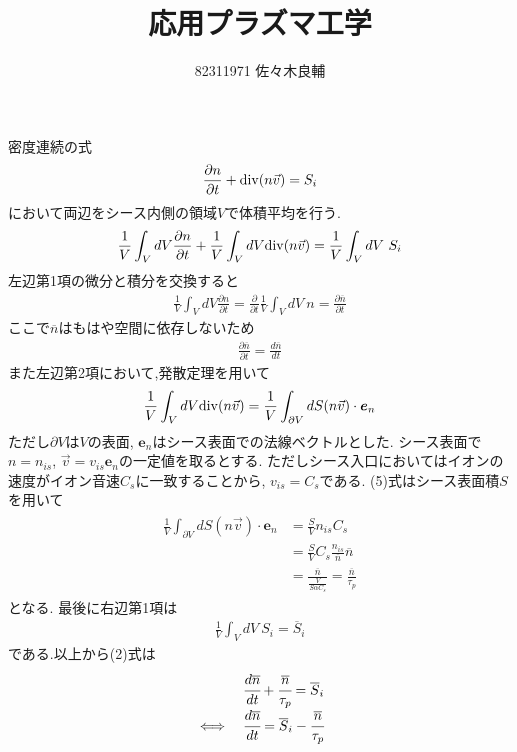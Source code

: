 \documentclass[uplatex,a4j,11pt,dvipdfmx]{jsarticle}
\begin{document}
\title{応用プラズマ工学}
\author{82311971 佐々木良輔}
\date{}
\maketitle
密度連続の式
\begin{align}
  \frac{\partial n}{\partial t}+{\rm div}(n\vec{v})=S_i
\end{align}
において両辺をシース内側の領域$V$で体積平均を行う.
\begin{align}
  \frac{1}{V}\int_VdV\frac{\partial n}{\partial t}+\frac{1}{V}\int_VdV{\rm div}(n\vec{v})=\frac{1}{V}\int_VdV\ S_i
\end{align}
左辺第1項の微分と積分を交換すると
\begin{align}
  \frac{1}{V}\int_VdV\frac{\partial n}{\partial t}=\frac{\partial}{\partial t}\frac{1}{V}\int_VdV\ n=\frac{\partial\overline{n}}{\partial t}
\end{align}
ここで$\overline{n}$はもはや空間に依存しないため
\begin{align}
  \frac{\partial\overline{n}}{\partial t}=\frac{d\overline{n}}{dt}
\end{align}
また左辺第2項において,発散定理を用いて
\begin{align}
  \frac{1}{V}\int_VdV{\rm div}(n\vec{v})=\frac{1}{V}\int_{\partial V}dS(n\vec{v})\cdot{\bm e}_n
\end{align}
ただし$\partial V$は$V$の表面, ${\bm e}_n$はシース表面での法線ベクトルとした.
シース表面で$n=n_{is}$, $\vec{v}=v_{is}{\bm e}_n$の一定値を取るとする.
ただしシース入口においてはイオンの速度がイオン音速$C_s$に一致することから, $v_{is}=C_s$である.
(5)式はシース表面積$S$を用いて
\begin{align}
  \begin{split}
    \frac{1}{V}\int_{\partial V}dS(n\vec{v})\cdot{\bm e}_n&=\frac{S}{V}n_{is}C_s\\
    &=\frac{S}{V}C_s\frac{n_{is}}{\overline{n}}\overline{n}\\
    &=\frac{\overline{n}}{\frac{V}{S\alpha C_s}}=\frac{\overline{n}}{\tau_p}
  \end{split}
\end{align}
となる.
最後に右辺第1項は
\begin{align}
  \frac{1}{V}\int_VdV\ S_i=\overline{S}_i
\end{align}
である.以上から(2)式は
\begin{align}
  \begin{array}{cc}
    &\cfrac{d\overline{n}}{dt}+\cfrac{\overline{n}}{\tau_p}=\overline{S}_i\\
    \iff&\cfrac{d\overline{n}}{dt}=\overline{S}_i-\cfrac{\overline{n}}{\tau_p}
  \end{array}
\end{align}
\end{document}
